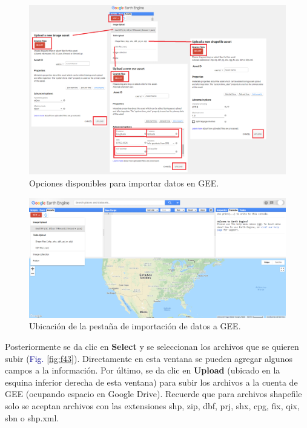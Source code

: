 \documentclass[
  12pt,
  letterpaper,
  twoside]{book}
\begin{document}
\begin{figure}[H]

{\centering \includegraphics[width=0.95\linewidth]{Img/newAssets} 

}

\caption{Opciones disponibles para importar datos en GEE.}\label{fig:f41}
\end{figure}

\begin{figure}[H]

{\centering \includegraphics[width=0.95\linewidth]{Img/Asset1} 

}

\caption{Ubicación de la pestaña de importación de datos a GEE.}\label{fig:f42}
\end{figure}

Posteriormente se da clic en \textbf{Select} y se seleccionan los archivos que se quieren subir (\textcolor{darkblue}{Fig.} \ref{fig:f43}). Directamente en esta ventana se pueden agregar algunos campos a la información. Por último, se da clic en \textbf{Upload} (ubicado en la esquina inferior derecha de esta ventana) para subir los archivos a la cuenta de GEE (ocupando espacio en Google Drive). Recuerde que para archivos shapefile solo se aceptan archivos con las extensiones shp, zip, dbf, prj, shx, cpg, fix, qix, sbn o shp.xml.
\end{document}
